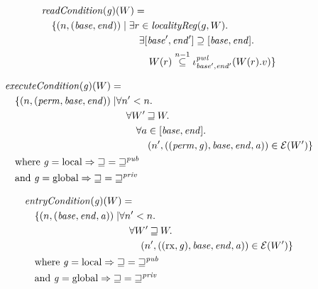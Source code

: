 \documentclass[a4paper]{article}
\newcommand{\nsubeq}[1][n]{\stackrel{\tiny{#1}}{\subseteq}}
\newcommand{\var}[1]{\mathit{#1}}
\newcommand{\gl}{\var{g}}
\newcommand{\addr}{\var{a}}
\newcommand{\start}{\var{base}}
\newcommand{\addrend}{\var{end}}
\newcommand{\perm}{\var{perm}}
\newcommand{\plainfun}[2]{
  \ifthenelse{\equal{#2}{}}
             {\mathit{#1}}
             {\mathit{#1}(#2)}
}
\newcommand{\readCond}[1]{\plainfun{readCondition}{#1}}
\newcommand{\execCond}[1]{\plainfun{executeCondition}{#1}}
\newcommand{\entryCond}[1]{\plainfun{entryCondition}{#1}}
\newcommand{\future}{\mathbin{\sqsupseteq}}
\newcommand{\futurewk}{\mathbin{\sqsupseteq}^{\var{pub}}}
\newcommand{\futurestr}{\mathbin{\sqsupseteq}^{\var{priv}}}
\newcommand{\asmType}{\plaindom{AsmType}}
\newcommand{\plaindom}[1]{\mathrm{#1}}
\newcommand{\intr}[2]{\mathcal{#1}}
\newcommand{\exprintr}[1]{\intr{E}{#1}}
\newcommand{\stder}{\exprintr{\asmType}}
\newcommand{\npair}[2][n]{\left(#1,#2 \right)}
\newcommand{\plainperm}[1]{\mathrm{#1}}
\newcommand{\exec}{\plainperm{rx}}
\newcommand{\local}{\plainperm{local}}
\newcommand{\glob}{\plainperm{global}}
\begin{document}
\begin{align*}
    & \readCond{}(\gl)(W) =  \\
    & \quad \begin{aligned}[t]
              \{ \npair{(\start,\addrend)} \mid & \;\exists r \in \var{localityReg}(g,W) \ldotp \\
                        & \;\quad \exists [\start',\addrend'] \supseteq [\start,\addrend] \ldotp \\
                        & \;\qquad W(r)\nsubeq[n-1] \iota^{\var{pwl}}_{\start',\addrend'}(W(r).v) \}
            \end{aligned}
\end{align*}

\begin{align*}
  & \execCond{}(\gl)(W) = \\
  & \quad
    \begin{aligned}[t]
      \{ \npair{(\perm,\start,\addrend)} \mid &  \forall n' < n \ldotp\\
      & \quad \forall W' \future W \ldotp\\
      & \qquad\forall a \in [\start,\addrend] \ldotp\\
      & \qquad \quad \npair[n']{((\perm,\gl),\start,\addrend,\addr)} \in \stder(W')\}
    \end{aligned} \\
  & \quad \text{where } \gl = \local \Rightarrow \future = \futurewk \\
  & \quad \text{and } \gl = \glob \Rightarrow \future = \futurestr
\end{align*}

\begin{align*}
  & \entryCond{}(\gl)(W) = \\
  & \quad
    \begin{aligned}[t]
      \{ \npair{(\start,\addrend,\addr)} \mid &  \forall n' < n \ldotp\\
      & \quad \forall W' \future W \ldotp\\
      & \qquad \npair[n']{((\exec,\gl),\start,\addrend,\addr)} \in \stder(W')\}
    \end{aligned} \\
  & \quad \text{where } \gl = \local \Rightarrow \future = \futurewk \\
  & \quad \text{and } \gl = \glob \Rightarrow \future = \futurestr
\end{align*}
\end{document}
